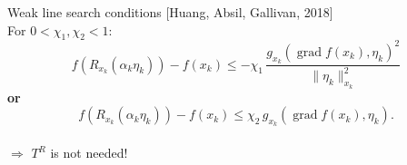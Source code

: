 \documentclass[9pt]{beamer}
\begin{document}

\begin{frame}{Weak line search conditions}
    \vspace{-1\baselineskip}\hfill{\tiny{[Huang, Absil, Gallivan, 2018]}} \\
    For $0 < \chi_1, \chi_2 < 1$:
    \begin{equation}
        f(R_{x_k}(\alpha_k \eta_k)) - f(x_k) \leq - \chi_1 \, \frac{{g_{x_k} (\operatorname{grad} f(x_k), \eta_k)}^2}{\lVert \eta_k \rVert^2_{x_k}}
    \end{equation} 
    \textbf{or}
    \begin{equation}
        f(R_{x_k}(\alpha_k \eta_k)) - f(x_k) \leq \chi_2 \, g_{x_k} (\operatorname{grad} f(x_k), \eta_k).
    \end{equation} \\[1.\baselineskip]
    $\Rightarrow$ $T^R$ is not needed!
\end{frame}
\end{document}
